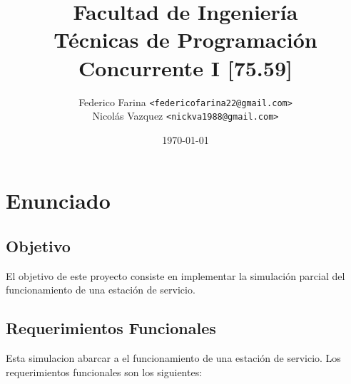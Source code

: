 \documentclass[12pt,a4paper,titlepage,oneside]{article}
\title{Facultad de Ingeniería\\Técnicas de Programación Concurrente I [75.59]}
\author{Federico Farina \texttt{<federicofarina22{@}gmail.com>}\\
Nicolás Vazquez \texttt{<nickva1988@gmail.com>}}
\date{\today}
\begin{document}
    \fancyhead[LE]{\leftmark} 
    \fancyhead[RO]{\rightmark} 
    \renewcommand{\headrulewidth}{0.4pt} 
    \renewcommand{\footrulewidth}{0pt}

    \pagestyle{fancy}


 \maketitle
  \setcounter{page}{1}
  \tableofcontents

\newpage{}
\setcounter{page}{1}

\section{Enunciado}

\subsection{Objetivo}

El objetivo de este proyecto consiste en implementar la simulación parcial del funcionamiento de una estación de servicio.

\subsection{Requerimientos Funcionales}

Esta simulacion abarcar a el funcionamiento de una estación de servicio. Los requerimientos funcionales son los siguientes:
\end{document}
